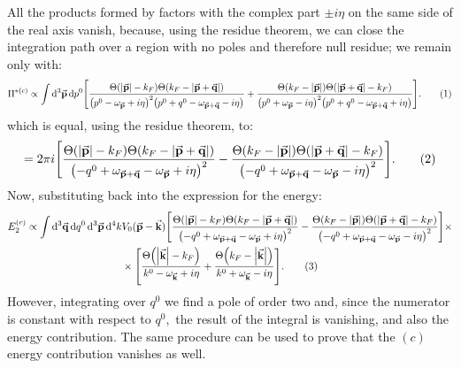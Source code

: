 \documentclass[a4paper]{article}
\newcommand{\numberthis}{\addtocounter{equation}{1}\tag{\theequation}}
\newcommand{\Ta}{\Theta\pqty{\abs{\va{p}+\va{q}}-k_F}}
\newcommand{\Taa}{\Theta\pqty{k_F - \abs{\va{p}+\va{q}}}}
\newcommand{\Td}{\Theta\pqty{\abs{\va{p}}-k_F}}
\newcommand{\Tdd}{\Theta\pqty{k_F -\abs{\va{p}}}}
\newcommand{\Tf}{\Theta\pqty{\abs{\va{k}}-k_F}}
\newcommand{\Tff}{\Theta\pqty{k_F -\abs{\va{k}}}}
\begin{document}
All the products formed by factors with the complex part $\pm i\eta$ on the same side of the real axis vanish, because, using the residue theorem, we can close the integration path over a region with no poles and therefore null residue; we remain only with:
\begin{align*}
\Pi^{*(c)} \propto \int \dd[3]{\va{p}}\dd{p^0}&
\bqty{\frac{\Td\Taa}{\pqty{p^0-\omega_{\va{p}} +i\eta}^2\pqty{p^0+q^0 -\omega_{\va{p}+\va{q}}-i\eta}}+ \frac{\Tdd\Ta}{\pqty{p^0+\omega_{\va{p}} -i\eta}^2\pqty{p^0 +q^0 -\omega_{\va{p} + \va{q}} + i\eta}}} .\numberthis \\
\end{align*}
which is equal, using the residue theorem, to:
\begin{align*}
= 2\pi i\bqty{\frac{\Td\Taa}{\pqty{-q^0 +\omega_{\va{p}+\va{q}}-\omega_{\va{p}}+i\eta}^2}- \frac{\Tdd\Ta}{\pqty{-q^0 +\omega_{\va{p}+\va{q}}-\omega_{\va{p}}-i\eta}^2}} .\numberthis \\
\end{align*}
Now, substituting back into the expression for the energy:
\begin{align*}
E_2^{(c)} \propto\int \dd[3]{\va{q}}\dd{q^0}\dd[3]{\va{p}}\dd[4]{k}& V_0(\va{p} -\va{k})
\bqty{\frac{\Td\Taa}{\pqty{-q^0 +\omega_{\va{p}+\va{q}}-\omega_{\va{p}}+i\eta}^2}- \frac{\Tdd\Ta}{\pqty{-q^0 +\omega_{\va{p}+\va{q}}-\omega_{\va{p}}-i\eta}^2}} \times \\
&\times \bqty{\frac{\Tf}{k^0-\omega_{\va{k}} +i\eta}+ \frac{\Tff}{k^0+\omega_{\va{k}} -i\eta}}.\numberthis \\
\end{align*}
However, integrating over $q^0$ we find a pole of order two and, since the numerator is constant with respect to $q^0,$ the result of the integral is vanishing, and also the energy contribution.
The same procedure can be used to prove that the $(c)$ energy contribution vanishes as well.








\bigskip
\end{document}
